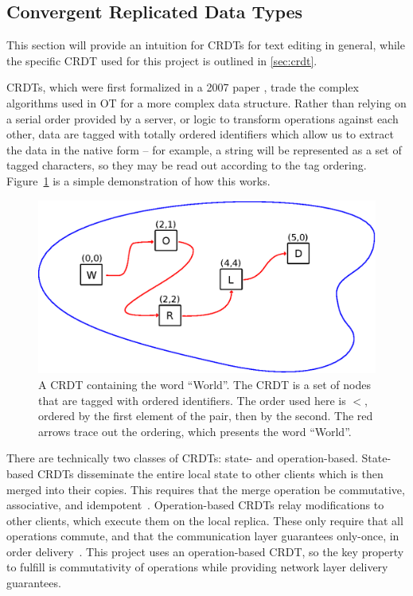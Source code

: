 \documentclass[12pt,a4paper,twoside,openright]{report}
\begin{document}
	\subsection{Convergent Replicated Data Types} \label{sec:crdtoverview}
	
	This section will provide an intuition for CRDTs for text editing in general, while the specific CRDT used for this project is outlined in \cref{sec:crdt}.

	CRDTs, which were first formalized in a 2007 paper \cite{shapiro2007}, trade the complex algorithms used in OT for a more complex data structure. Rather than relying on a serial order provided by a server, or logic to transform operations against each other, data are tagged with totally ordered identifiers which allow us to extract the data in the native form -- for example, a string will be represented as a set of tagged characters, so they may be read out according to the tag ordering. Figure~\ref{fig:taggedset} is a simple demonstration of how this works. 
	
	\begin{figure}[H]
	\centering
	\includegraphics[width=1\linewidth]{figs/tagged_set.eps}
	\caption[Text CRDT as a tagged set]{A CRDT containing the word ``World''. The CRDT is a set of nodes that are tagged with ordered identifiers. The order used here is $<$, ordered by the first element of the pair, then by the second. The red arrows trace out the ordering, which presents the word ``World''.}
	\label{fig:taggedset}
	\end{figure}
	
	There are technically two classes of CRDTs: state- and operation-based. State-based CRDTs disseminate the entire local state to other clients which is then merged into their copies. This requires that the merge operation be commutative, associative, and idempotent~\cite{shapiro2011}. Operation-based CRDTs relay modifications to other clients, which execute them on the local replica. These only require that all operations commute, and that the communication layer guarantees only-once, in order delivery~\cite{takada2013}. This project uses an operation-based CRDT, so the key property to fulfill is commutativity of operations while providing network layer delivery guarantees.
	
\end{document}
